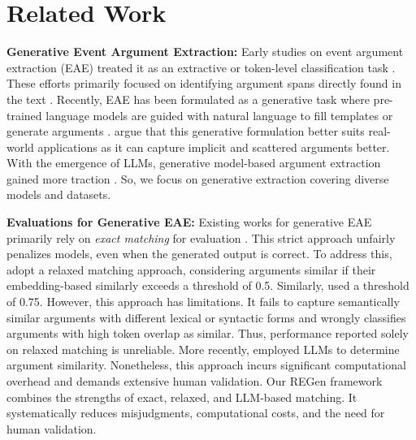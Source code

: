 \section{Related Work}
\textbf{Generative Event Argument Extraction:} 
Early studies on event argument extraction (EAE) treated it as an extractive or token-level classification task \cite{doddington-etal-2004-automatic, du-cardie-2020-event}. These efforts primarily focused on identifying argument spans directly found in the text \cite{sun-etal-2022-phee}. Recently, EAE has been formulated as a generative task where pre-trained language models are guided with natural language to fill templates or generate arguments \cite{hsu-etal-2022-degree}. \citet{sharif-etal-2024-explicit} argue that this generative formulation better suits real-world applications as it can capture implicit and scattered arguments better. With the emergence of LLMs,  generative model-based argument extraction gained more traction \cite{sun-etal-2024-leveraging, he-etal-2024-demonstration}. So, we focus on generative extraction covering diverse models and datasets. 

\noindent
\textbf{Evaluations for Generative EAE:} Existing works for generative EAE primarily rely on \textit{exact matching} for evaluation \cite{huang-etal-2024-textee}. This strict approach unfairly penalizes models, even when the generated output is correct. To address this, \citet{han2024empiricalstudyinformationextraction} adopt a relaxed matching approach, considering arguments similar if their embedding-based similarly exceeds a threshold of 0.5. Similarly, \citet{sharif-etal-2024-explicit} used a threshold of 0.75. However, this approach has limitations. It fails to capture semantically similar arguments with different lexical or syntactic forms and wrongly classifies arguments with high token overlap as similar. Thus, performance reported solely on relaxed matching is unreliable. More recently, 
\citet{lu2024exactmatchsemanticallyreassessing} employed LLMs to determine argument similarity. Nonetheless, this approach incurs significant computational overhead and demands extensive human validation. Our REGen framework combines the strengths of exact, relaxed, and LLM-based matching. It systematically reduces misjudgments, computational costs, and the need for human validation. 
